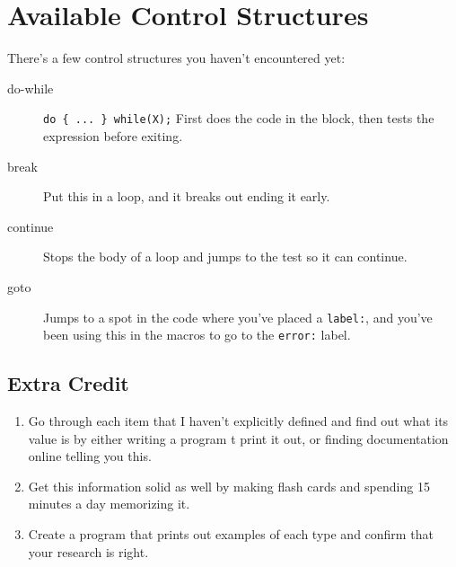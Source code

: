 \section{Available Control Structures}

There's a few control structures you haven't encountered yet:

\begin{description}
\item[do-while] \verb|do { ... } while(X);| First does the code in the block, then
    tests the  expression before exiting.
\item[break] Put this in a loop, and it breaks out ending it early.
\item[continue] Stops the body of a loop and jumps to the test so it can continue.
\item[goto] Jumps to a spot in the code where you've placed a \verb|label:|, and
    you've been using this in the  macros to go to the \verb|error:|
    label.
\end{description}


\subsection{Extra Credit}

\begin{enumerate}
\item Go through each item that I haven't explicitly defined and find out what 
    its value is by either writing a program t print it out, or finding documentation
    online telling you this.
\item Get this information solid as well by making flash cards and spending 15 
    minutes a day memorizing it.
\item Create a program that prints out examples of each type and confirm that your
    research is right.
\end{enumerate}
